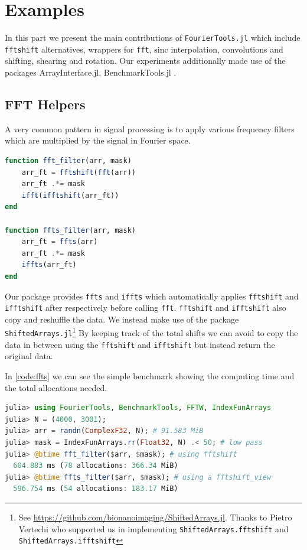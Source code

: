 \documentclass{juliacon}
\def\lc{\lstinline}
\begin{document}
    

\section{Examples}
    In this part we present the main contributions of \verb|FourierTools.jl| which
    include \lstinline{fftshift} alternatives, wrappers for \lstinline{fft}, $\mathrm{sinc}$ interpolation, convolutions and shifting, shearing and rotation.
    Our experiments additionally made use of the packages ArrayInterface.jl\cite{DifferentialEquations.jl-2017}, BenchmarkTools.jl\cite{BenchmarkTools.jl-2016} .
    
    \subsection{FFT Helpers}
        A very common pattern in signal processing is to apply various frequency filters
        which are multiplied by the signal in Fourier space. 
\begin{lstlisting}[language=Julia, caption={Typical workflow to manipulate the data in Fourier space. Note that it would be also possible to \lc{ifftshift(mask)} instead of rearranging the data twice. However, this breaks apart once one has a non-straightforward accessing scheme instead of a plain array which is multiplied.}, 
label = {lst:example_render}, 
captionpos = b,]
function fft_filter(arr, mask)
    arr_ft = fftshift(fft(arr))
    arr_ft .*= mask
    ifft(ifftshift(arr_ft))
end

function ffts_filter(arr, mask)
    arr_ft = ffts(arr) 
    arr_ft .*= mask
    iffts(arr_ft)
end
\end{lstlisting}


Our package provides \lc{ffts} and \lc{iffts} which automatically applies \lc{fftshift} and \lc{ifftshift} after respectively before calling \lc{fft}.
\lc{fftshift} and \lc{ifftshift} also copy and reshuffle the data. We instead make use of the package
\verb|ShiftedArrays.jl|\footnote{See \url{https://github.com/bionanoimaging/ShiftedArrays.jl}. Thanks
to Pietro Vertechi who supported us in implementing \lc{ShiftedArrays.fftshift} and \lc{ShiftedArrays.ifftshift}}
By keeping track of the total shifts we can avoid to copy the data in between using the \lc{fftshift} and \lc{ifftshift} but instead return the original data.

In \autoref{code:ffts} we can see the simple benchmark showing the computing time and the total
allocations needed.
\begin{lstlisting}[language=Julia, label={code:ffts}, caption={By using \lc{ffts} we can save a factor of 2 in memory}, captionpos=b]
julia> using FourierTools, BenchmarkTools, FFTW, IndexFunArrays
julia> N = (4000, 3001);
julia> arr = randn(ComplexF32, N); # 91.583 MiB
julia> mask = IndexFunArrays.rr(Float32, N) .< 50; # low pass
julia> @btime fft_filter($arr, $mask); # using fftshift
  604.883 ms (78 allocations: 366.34 MiB)
julia> @btime ffts_filter($arr, $mask); # using a fftshift_view
  596.754 ms (54 allocations: 183.17 MiB)
\end{lstlisting}
\end{document}
